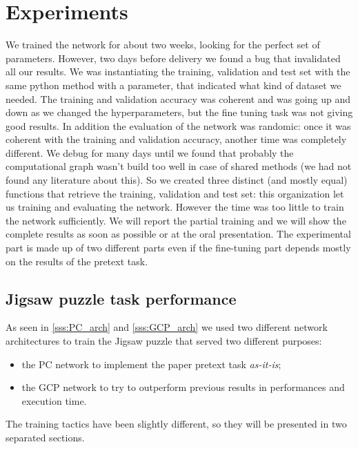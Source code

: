 \section{Experiments}\label{s:experiments}
We trained the network for about two weeks, looking for the perfect set of parameters. However, two days before delivery we found a bug that invalidated all our results. We was instantiating the training, validation and test set with the same python method with a parameter, that indicated what kind of dataset we needed. The training and validation accuracy was coherent and was going up and down as we changed the hyperparameters, but the fine tuning task was not giving good results. In addition the evaluation of the network was randomic: once it was coherent with the training and validation accuracy, another time was completely different. We debug for many days until we found that probably the computational graph wasn't build too well in case of shared methods (we had not found any literature about this). So we created three distinct (and mostly equal) functions that retrieve the training, validation and test set: this organization let us training and evaluating the network. However the time was too little to train the network sufficiently. We will report the partial training and we will show the complete results as soon as possible or at the oral presentation.\newline
The experimental part is made up of two different parts even if the fine-tuning part depends mostly on the results of the pretext task. 


\subsection{Jigsaw puzzle task performance}
As seen in \ref{sss:PC_arch} and \ref{sss:GCP_arch} we used two different network architectures to train the Jigsaw puzzle that served two different purposes:
\begin{itemize}
    \item the PC network to implement the paper pretext task \emph{as-it-is};
    \item the GCP network to try to outperform previous results in performances and execution time.
\end{itemize}
The training tactics have been slightly different, so they will be presented in two separated sections.

